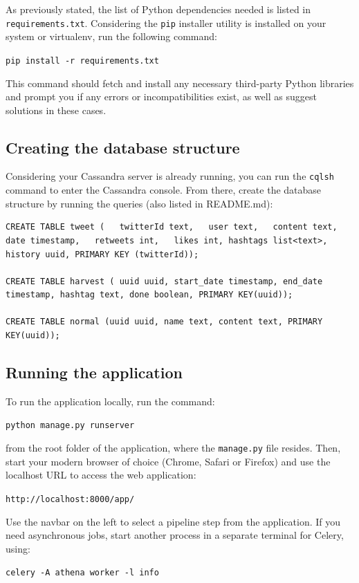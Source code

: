 \documentclass[12pt,a4paper,twoside]{report}
\begin{document}
As previously stated, the list of Python dependencies needed is listed in \texttt{requirements.txt}. Considering the \texttt{pip} installer utility is installed on your system or virtualenv, run the following command:

\texttt{pip install -r requirements.txt}

This command should fetch and install any necessary third-party Python libraries and prompt you if any errors or incompatibilities exist, as well as suggest solutions in these cases.

\subsection*{Creating the database structure}
Considering your Cassandra server is already running, you can run the \texttt{cqlsh} command to enter the Cassandra console. From there, create the database structure by running the queries (also listed in README.md):

\begin{lstlisting}
CREATE TABLE tweet (   twitterId text,   user text,   content text,   date timestamp,   retweets int,   likes int, hashtags list<text>, history uuid, PRIMARY KEY (twitterId));

CREATE TABLE harvest ( uuid uuid, start_date timestamp, end_date timestamp, hashtag text, done boolean, PRIMARY KEY(uuid));

CREATE TABLE normal (uuid uuid, name text, content text, PRIMARY KEY(uuid));
\end{lstlisting}

\subsection*{Running the application}
To run the application locally, run the command:

\texttt{python manage.py runserver}

from the root folder of the application, where the \texttt{manage.py} file resides. Then, start your modern browser of choice (Chrome, Safari or Firefox) and use the localhost URL to access the web application:

\texttt{http://localhost:8000/app/}

Use the navbar on the left to select a pipeline step from the application. If you need asynchronous jobs, start another process in a separate terminal for Celery, using:

\texttt{celery -A athena worker -l info}
\end{document}
